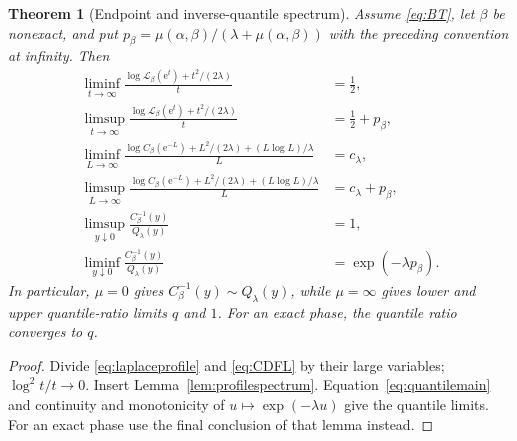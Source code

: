 \documentclass[11pt,a4paper]{article}
\newtheorem{theorem}{Theorem}[section]
\theoremstyle{definition}
\theoremstyle{remark}\newtheorem{remark}[theorem]{Remark}
\newcommand{\LL}{\mathcal L}
\newcommand{\e}{\mathrm e}
\begin{document}
\begin{theorem}[Endpoint and inverse-quantile spectrum]
\label{thm:spectrum}
Assume \eqref{eq:BT}, let $\beta$ be nonexact, and put
$p_\beta=\mu(\alpha,\beta)/(\lambda+\mu(\alpha,\beta))$ with the preceding
convention at infinity.  Then
\begin{align}
 \liminf_{t\to\infty}
   \frac{\log\LL_\beta(\e^t)+t^2/(2\lambda)}t&=\frac12,\nonumber\\
 \limsup_{t\to\infty}
   \frac{\log\LL_\beta(\e^t)+t^2/(2\lambda)}t&=\frac12+p_\beta,
 \label{eq:Lspec}\\
 \liminf_{L\to\infty}
   \frac{\log C_\beta(\e^{-L})+L^2/(2\lambda)+(L\log L)/\lambda}{L}
 &=c_\lambda,
 \label{eq:Cspecinf}\\
 \limsup_{L\to\infty}
   \frac{\log C_\beta(\e^{-L})+L^2/(2\lambda)+(L\log L)/\lambda}{L}
 &=c_\lambda+p_\beta,
 \label{eq:Cspecsup}\\
 \limsup_{y\downarrow0}\frac{C_\beta^{-1}(y)}{Q_\lambda(y)}&=1,\nonumber\\
 \liminf_{y\downarrow0}\frac{C_\beta^{-1}(y)}{Q_\lambda(y)}
 &=\exp(-\lambda p_\beta).
 \label{eq:Qspec}
\end{align}
In particular, $\mu=0$ gives $C_\beta^{-1}(y)\sim Q_\lambda(y)$, while
$\mu=\infty$ gives lower and upper quantile-ratio limits $q$ and $1$.
For an exact phase, the quantile ratio converges to $q$.
\end{theorem}
\begin{proof}
Divide \eqref{eq:laplaceprofile} and \eqref{eq:CDFL} by their large variables;
$\log^2 t/t\to0$.  Insert Lemma~\ref{lem:profilespectrum}.
Equation~\eqref{eq:quantilemain} and continuity and monotonicity of
$u\mapsto\exp(-\lambda u)$ give the quantile limits.
For an exact phase use the final conclusion of that lemma instead.
\end{proof}
\end{document}
